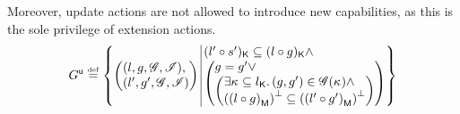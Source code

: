 Moreover, update actions are not allowed to introduce new
capabilities, as this is the sole privilege of extension actions.
\[
	\updateG \eqdef
 	\left\{
	\begin{array}{@{} l @{\hspace*{2pt}} | @{\hspace*{2pt}} r @{}}
	   	\left(
	   	\begin{array}{@{} l @{}}
	     	(l, g, \gmod, \lmod),\\
	     	(l', g', \gmod, \lmod)
	   	\end{array}
		\right)
	  	&
	  	\begin{array}{@{} l @{} }
	  		\capPart{(l' \composeL s')}  \subseteq \capPart{(l \composeL g)} \land\\
		  	\left(
		  	\begin{array}{@{} l @{} }
		 		g = g' \lor\\
		 	  	\left(
		 	  	\begin{array}{@{} l @{}}
		 	  		\exsts{\ca{} \subseteq \capPart{l}}
		 	  		(g, g') \in \gmod(\ca{}) \land\\
		 	  	
		 	  	\heapSize{\heapPart{\left(l \composeL g\right)}} \subseteq 
		 	  	\heapSize{\heapPart{\left(l' \composeL g'\right)}}
		 	  	\end{array}	
		 	  	\right)
		 	\end{array}
	   		\right)
   		\end{array}
 	\end{array}
	\right\}
\]
